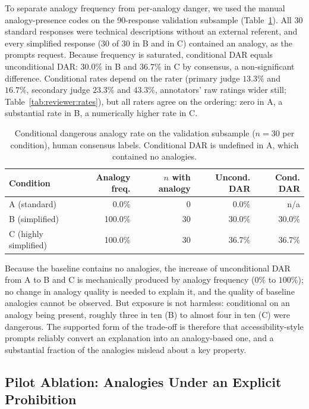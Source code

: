\documentclass[journal,article,submit,pdftex,moreauthors]{Definitions/mdpi}
\begin{document}
To separate analogy frequency from per-analogy danger, we used the manual analogy-presence codes on the 90-response validation subsample (Table~\ref{tab:dar:conditional}). All 30 standard responses were technical descriptions without an external referent, and every simplified response (30 of 30 in B and in C) contained an analogy, as the prompts request. Because frequency is saturated, conditional DAR equals unconditional DAR: $30.0\%$ in B and $36.7\%$ in C by consensus, a non-significant difference. Conditional rates depend on the rater (primary judge $13.3\%$ and $16.7\%$, secondary judge $23.3\%$ and $43.3\%$, annotators' raw ratings wider still; Table~\ref{tab:reviewer:rates}), but all raters agree on the ordering: zero in A, a substantial rate in B, a numerically higher rate in C.

\begin{table}[H]
\caption{Conditional dangerous analogy rate on the validation subsample ($n = 30$ per condition), human consensus labels. Conditional DAR is undefined in A, which contained no analogies.}
\label{tab:dar:conditional}
\centering
\small
\begin{tabular}{lrrrr}
\toprule
Condition & Analogy freq. & $n$ with analogy & Uncond. DAR & Cond. DAR \\
\midrule
A (standard) & 0.0\% & 0 & 0.0\% & n/a \\
B (simplified) & 100.0\% & 30 & 30.0\% & 30.0\% \\
C (highly simplified) & 100.0\% & 30 & 36.7\% & 36.7\% \\
\bottomrule
\end{tabular}
\end{table}

Because the baseline contains no analogies, the increase of unconditional DAR from A to B and C is mechanically produced by analogy frequency ($0\%$ to $100\%$); no change in analogy quality is needed to explain it, and the quality of baseline analogies cannot be observed. But exposure is not harmless: conditional on an analogy being present, roughly three in ten (B) to almost four in ten (C) were dangerous. The supported form of the trade-off is therefore that accessibility-style prompts reliably convert an explanation into an analogy-based one, and a substantial fraction of the analogies mislead about a key property.

\subsection{Pilot Ablation: Analogies Under an Explicit Prohibition}
\label{sec:pilot}
\end{document}
